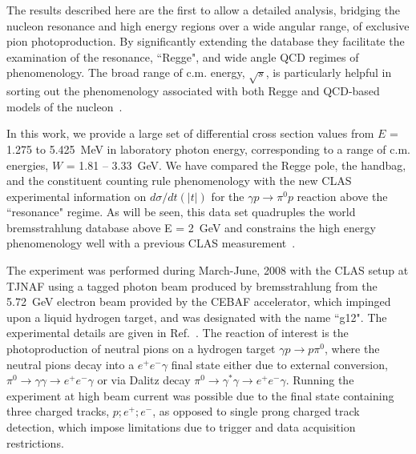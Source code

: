 \documentclass[aps,prc,twocolumn,floatfix,showpacs,preprintnumbers,amsmath,amssymb,superscriptaddress,linenumbers]{revtex4-1}
\begin{document}
The results described here are the first to allow a detailed analysis, bridging the nucleon resonance and high energy regions over a wide angular range, of exclusive pion photoproduction. By significantly extending the database they facilitate
the examination
%		 
		of the resonance, ``Regge", and wide angle QCD regimes of phenomenology. The 
		broad range of c.m. energy, $\sqrt{s}$, is particularly helpful in 
		sorting out the phenomenology associated with both Regge and QCD-based 
		models of the nucleon~\cite{Kroll:2017hym}.

In this work, we provide a large set of differential 
cross section values from $E$ = 1.275 to 5.425~MeV in laboratory photon 
energy, corresponding to a range of c.m. energies, $W$ = 1.81 -- 
3.33~GeV.  We have compared the Regge pole, the handbag, and the 
constituent counting rule phenomenology with the new CLAS experimental 
information on $d\sigma/dt(|t|)$ for the $\gamma p\rightarrow\pi^0p$ 
reaction above the ``resonance" regime. As will be seen, this data 
set quadruples the world bremsstrahlung database above E = 2~GeV and 
constrains the high energy phenomenology well with a previous CLAS 
measurement~\cite{Dugger:2007bt}.


The experiment was performed during March-June, 2008
with the CLAS setup at TJNAF using a tagged photon beam produced by 
bremsstrahlung from the 5.72~GeV electron beam provided by the CEBAF 
accelerator, which impinged upon a liquid hydrogen target,
and was designated with the name ``g12". 
The experimental details are given in Ref.~\cite{g12}. The reaction 
of interest is the photoproduction of neutral pions on a hydrogen 
target $\gamma p\rightarrow p\pi^0$, 
where the neutral pions decay into a $e^+e^-\gamma$ final state either due to external conversion, $\pi^0 \rightarrow\gamma\gamma 
\rightarrow e^+e^-\gamma$ or via Dalitz decay $\pi^0
\rightarrow\gamma^\ast\gamma\rightarrow e^+e^-\gamma$. Running the 
experiment at high beam current was possible due to the final state 
containing three charged tracks, $p;e^+;e^-$, as opposed to single 
prong charged track detection, which impose limitations due to trigger 
and data acquisition restrictions.
\end{document}
